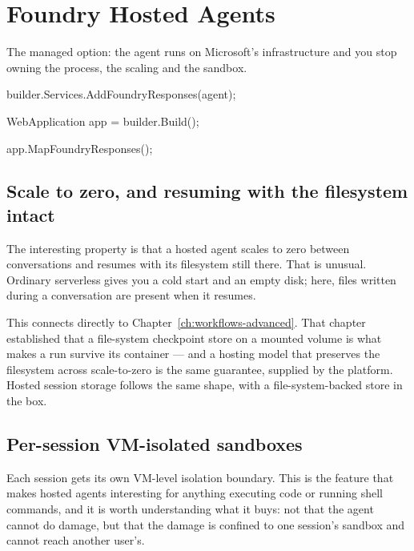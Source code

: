 \section{Foundry Hosted Agents}
\label{sec:host-foundry}

The managed option: the agent runs on Microsoft's infrastructure and you stop
owning the process, the scaling and the sandbox.

\begin{csharp}[caption={Hosting an agent as a Foundry responses endpoint}, label={lst:host-foundry}]
builder.Services.AddFoundryResponses(agent);

WebApplication app = builder.Build();

app.MapFoundryResponses();
\end{csharp}

\subsection{Scale to zero, and resuming with the filesystem intact}

The interesting property is that a hosted agent scales to zero between
conversations and resumes with its filesystem still there. That is unusual.
Ordinary serverless gives you a cold start and an empty disk; here, files written
during a conversation are present when it resumes.

This connects directly to Chapter~\ref{ch:workflows-advanced}. That chapter
established that a file-system checkpoint store on a mounted volume is what makes
a run survive its container --- and a hosting model that preserves the filesystem
across scale-to-zero is the same guarantee, supplied by the platform. Hosted
session storage follows the same shape, with a file-system-backed store in the
box.

\subsection{Per-session VM-isolated sandboxes}

Each session gets its own VM-level isolation boundary. This is the feature that
makes hosted agents interesting for anything executing code or running shell
commands, and it is worth understanding what it buys: not that the agent cannot
do damage, but that the damage is confined to one session's sandbox and cannot
reach another user's.

